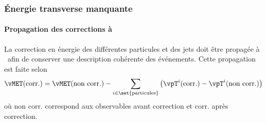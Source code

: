 \subsubsection{Énergie transverse manquante}
\paragraph{Propagation des corrections à \MET}
La correction en énergie des différentes particules et des jets doit être propagée à \MET\ afin de conserver une description cohérente des événements.
Cette propagation est faite selon
\begin{equation}
\vMET(\text{corr.}) = \vMET(\text{non corr.}) - \sum_{i\in\set{\text{particules}}} \left( \vpT^i(\text{corr.}) - \vpT^i(\text{non corr.}) \right)
\end{equation}
où
\og non corr. \fg{} correspond aux observables avant correction
et
\og corr. \fg{} après correction.
